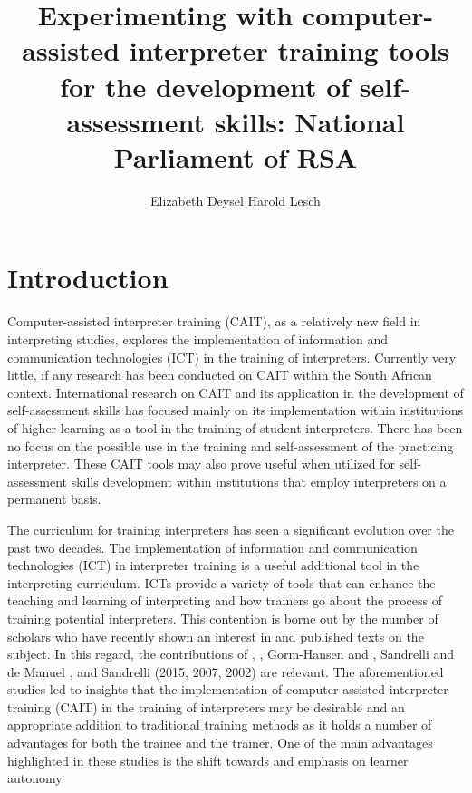 \documentclass[output=paper]{langsci/langscibook}
\author{Elizabeth Deysel \lastand Harold Lesch}
\title{Experimenting with computer-assisted interpreter training tools for the development of self-assessment skills: National Parliament of RSA}
\begin{document}
\section{Introduction} 
Computer-assisted interpreter training (CAIT), as a relatively new field in interpreting studies, explores the implementation of information and communication technologies (ICT) in the training of interpreters. Currently very little, if any research has been conducted on CAIT within the South African context. International research on CAIT and its application in the development of self-assessment skills has focused mainly on its implementation within institutions of higher learning as a tool in the training of student interpreters. There has been no focus on the possible use in the training and self-assessment of the practicing interpreter. These CAIT tools may also prove useful when utilized for self-assessment skills development within institutions that employ interpreters on a permanent basis.  

The curriculum for training interpreters has seen a significant evolution over the past two decades. The implementation of information and communication technologies (ICT) in interpreter training is a useful additional tool in the interpreting curriculum. ICTs provide a variety of tools that can enhance the teaching and learning of interpreting and how trainers go about the process of training potential interpreters. This contention is borne out by the number of scholars who have recently shown an interest in and published texts on the subject. In this regard, the contributions of \citet{Lim2014}, \citet{Pinazo2008}, Gorm-Hansen and \citet{Shlesinger2007}, Sandrelli and de Manuel \citet{Jerez2007}, \citet{Lee2005} and Sandrelli (2015, 2007, 2002) are relevant. The aforementioned studies led to insights that the implementation of computer-assisted interpreter training (CAIT) in the training of interpreters may be desirable and an appropriate addition to traditional training methods as it holds a number of advantages for both the trainee and the trainer. One of the main advantages highlighted in these studies is the shift towards and emphasis on learner autonomy. 
\end{document}
